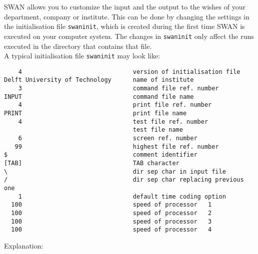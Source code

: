\documentclass[12pt]{book}
\begin{document}
 \label{ch:usechan}

SWAN allows you to customize the input and the output to the wishes of your
department, company or institute. This can be done by changing the settings
in the initialisation file {\tt swaninit}, which is created during the first time
SWAN is executed on your computer system. The changes in {\tt swaninit} only affect
the runs executed in the directory that contains that file.
\\[2ex]
\noindent
A typical initialisation file {\tt swaninit} may look like:
\begin{verbatim}
    4                               version of initialisation file
Delft University of Technology      name of institute
    3                               command file ref. number
INPUT                               command file name
    4                               print file ref. number
PRINT                               print file name
    4                               test file ref. number
                                    test file name
    6                               screen ref. number
   99                               highest file ref. number
$                                   comment identifier
[TAB]                               TAB character
\                                   dir sep char in input file
/                                   dir sep char replacing previous one
    1                               default time coding option
  100                               speed of processor   1
  100                               speed of processor   2
  100                               speed of processor   3
  100                               speed of processor   4
\end{verbatim}
\newpage
\noindent
Explanation:
\end{document}
